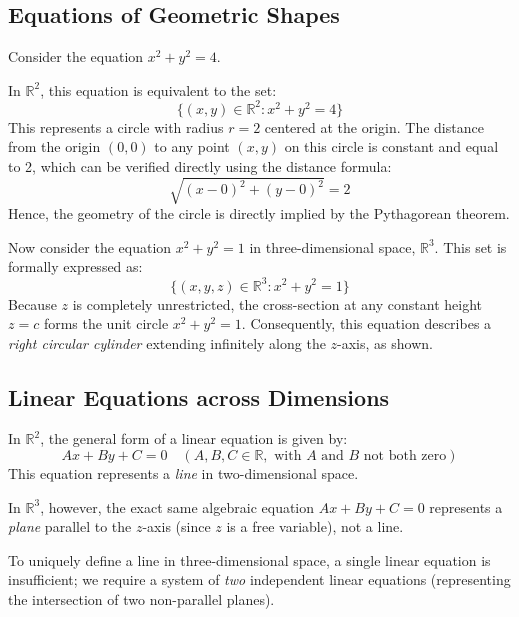 \subsection{Equations of Geometric Shapes}

Consider the equation $x^2 + y^2 = 4$.

In $\mathbb{R}^2$, this equation is equivalent to the set:
\[
\{(x,y) \in \mathbb{R}^2 : x^2 + y^2 = 4\}
\]
This represents a circle with radius $r=2$ centered at the origin. The distance from the origin $(0,0)$ to any point $(x,y)$ on this circle is constant and equal to 2, which can be verified directly using the distance formula:
\[
\sqrt{(x-0)^2 + (y-0)^2} = 2
\]
Hence, the geometry of the circle is directly implied by the Pythagorean theorem.

Now consider the equation $x^2 + y^2 = 1$ in three-dimensional space, $\mathbb{R}^3$. This set is formally expressed as:
\[
\{(x,y,z) \in \mathbb{R}^3 : x^2 + y^2 = 1\}
\]
Because $z$ is completely unrestricted, the cross-section at any constant height $z=c$ forms the unit circle $x^2 + y^2 = 1$. Consequently, this equation describes a \textit{right circular cylinder} extending infinitely along the $z$-axis, as shown.

\begin{center}
\end{center}
\subsection{Linear Equations across Dimensions}

In $\mathbb{R}^2$, the general form of a linear equation is given by:
\[
Ax + By + C = 0 \quad (A, B, C \in \mathbb{R}, \text{ with } A \text{ and } B \text{ not both zero})
\]
This equation represents a \textit{line} in two-dimensional space.

In $\mathbb{R}^3$, however, the exact same algebraic equation $Ax + By + C = 0$ represents a \textit{plane} parallel to the $z$-axis (since $z$ is a free variable), not a line. 

To uniquely define a line in three-dimensional space, a single linear equation is insufficient; we require a system of \textit{two} independent linear equations (representing the intersection of two non-parallel planes).
